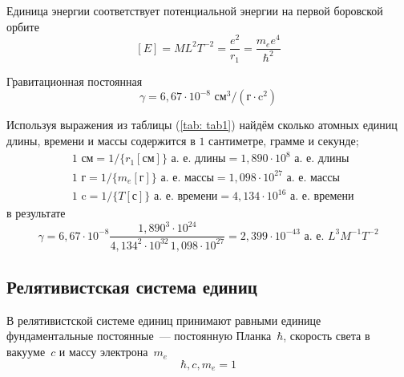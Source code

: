 \documentclass[a4paper,14pt]{extarticle} %
\begin{document}
	Единица энергии соответствует  потенциальной энергии на первой боровской орбите
	\[
	[E]=ML^2T^{-2} = \frac{e^2}{r_1} = \frac{m_e e^4}{\hbar^2}
	\]
	
	Гравитационная постоянная
	\[
	\gamma = 6,67\cdot10^{-8}\text{ см}^3/(\text{г}\cdot\text{c}^2)
	\]
	
	Используя выражения из таблицы (\ref{tab: tab1}) найдём сколько атомных единиц длины, времени и массы содержится в \(1\) сантиметре, грамме и секунде;
	{
	\begin{equation*}
	\begin{split}
	& 1\text{~см} = 1/\{r_1[\text{см}]\} \text{~а.~е.~длины} =
		1,890\cdot10^{8} \text{~а.~е.~длины} \\
	& 1\text{~г} = 1/\{m_e[\text{г}]\} \text{~а.~е.~массы} = 
		1,098\cdot10^{27} \text{~а.~е.~массы} \\
	& 1\text{~c} = 1/\{T[\text{с}]\} \text{~а.~е.~времени} = 
	4,134\cdot10^{16} \text{~а.~е.~времени}		
	\end{split}
	\end{equation*}
	}
	в результате 
	\[
	\gamma = 
	6,67\cdot10^{-8} \frac{1,890^3\cdot10^{24}}{4,134^2\cdot10^{32}\, 1,098\cdot10^{27}} = 2,399\cdot10^{-43}  \text{~а.~е.~}L^3M^{-1}T^{-2}
	\]
	
	\subsection{Релятивистская система единиц}
	В релятивистской системе единиц принимают равными единице фундаментальные постоянные~---  постоянную Планка~\(\hbar\), скорость света в вакууме~\(c\) и массу электрона~\(m_e\)
	\begin{equation}\label{eq: eq2}
		\hbar, c, m_e = 1
	\end{equation}
	
\end{document}
